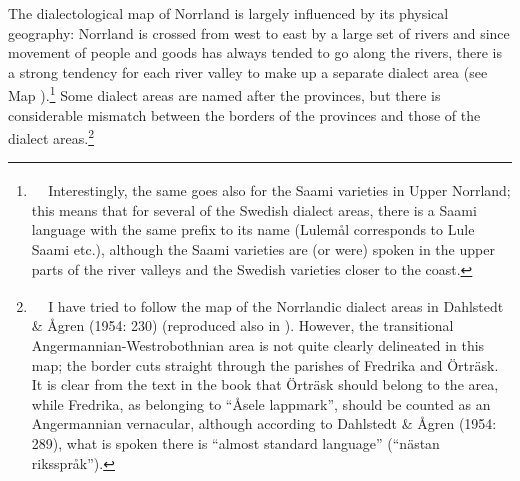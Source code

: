 \begin{styleBodytextC}
The dialectological map of Norrland is largely influenced by its physical geography: Norrland is crossed from west to east by a large set of rivers and since movement of people and goods has always tended to go along the rivers, there is a strong tendency for each river valley to make up a separate dialect area (see Map ).\footnote{\textsuperscript{\ \ } Interestingly, the same goes also for the Saami varieties in Upper Norrland; this means that for several of the Swedish dialect areas, there is a Saami language with the same prefix to its name (Lulemål corresponds to Lule Saami etc.), although the Saami varieties are (or were) spoken in the upper parts of the river valleys and the Swedish varieties closer to the coast.} Some dialect areas are named after the provinces, but there is considerable mismatch between the borders of the provinces and those of the dialect areas.\footnote{\textsuperscript{\ \ } I have tried to follow the map of the Norrlandic dialect areas in Dahlstedt \& Ågren (1954: 230) (reproduced also in \citet{Dahlstedt1971}). However, the transitional Angermannian-Westrobothnian area is not quite clearly delineated in this map; the border cuts straight through the parishes of Fredrika and Örträsk. It is clear from the text in the book that Örträsk should belong to the area, while Fredrika, as belonging to “Åsele lappmark”, should be counted as an Angermannian vernacular, although according to Dahlstedt \& Ågren (1954: 289), what is spoken there is “almost standard language” (“nästan riksspråk”). } 

\end{styleBodytextC}


